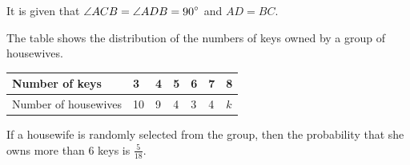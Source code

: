 \documentclass[11pt,paper=a4,answers]{exam}
\begin{document}
\begin{questions}
    It is given that 
    $\displaystyle \angle ACB = \angle ADB = 90\degree$ and $\displaystyle AD = BC$.
    
    \droppoints

\vspace{0.5cm}
\label{Q9: Stats/ Central Tendency}
\question[5]
    The table shows the distribution of the numbers of keys owned by a group of housewives.

    \begin{center}
        \begin{tabular}{|M{4cm}||M{1cm}|M{1cm}|M{1cm}|M{1cm}|M{1cm}|M{1cm}|}
        \hline
        Number of keys & 3 & 4 & 5 & 6 & 7 & 8 \\ \hline
        Number of housewives & 10 & 9 & 4 & 3 & 4 & $k$
        \\
        \hline
        \end{tabular}
    \end{center}

    If a housewife is randomly selected from the group, then the probability that she owns more than 6 keys is $\displaystyle \frac{5}{18}$.
    
    \droppoints
\end{questions}
\end{document}
